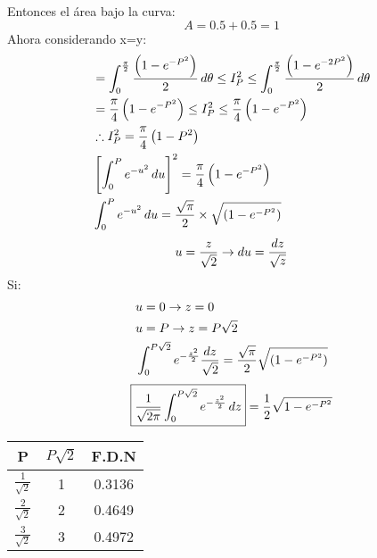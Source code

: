 \documentclass[
	12pt, %
	fleqn, %
	a4paper, %
]{LegrandOrangeBook}
\begin{document}
\begin{theorem}[Demostrar $\int_0^{\infty}e^{-u^2}\diff u=\frac{\sqrt{\pi}}{2}$]
Entonces el área bajo la curva:
\begin{displaymath}
A=0.5+0.5=1
\end{displaymath}
Ahora considerando x=y:
\begin{align*}
&=\int_0^{\frac{\pi}{2}}\frac{\left(1-e^{-P^2}\right)}{2}\mathop{}\!d\theta\leq I_P^2\leq \int_0^{\frac{\pi}{2}}\frac{\left(1-e^{-2P^2}\right)}{2}\mathop{}\!d\theta\\
&=\frac{\pi}{4}\left(1-e^{-P^2}\right)\leq I_P^2\leq\frac{\pi}{4}\left(1-e^{-P^2}\right)\\
&\therefore I_P^2=\frac{\pi}{4}\left(1-P^2\right)\\
&\left[\int_0^Pe^{-u^2}\mathop{}\!d u\right]^2=\frac{\pi}{4}\left(1-e^{-P^2}\right)\\
&\int_0^Pe^{-u^2}\mathop{}\!d u=\frac{\sqrt{\pi}}{2}\times\sqrt{(1-e^{-P^2})}
\end{align*}
\begin{displaymath}
u=\frac{z}{\sqrt{2}}\rightarrow\mathop{}\!d u=\frac{dz}{\sqrt{z}}
\end{displaymath}
Si:
\begin{align*}
&u=0\rightarrow z=0\\
&u=P\rightarrow z=P\sqrt{2}\\
&\int_0^{P\sqrt{2}}e^{-\frac{z^2}{2}}\frac{\mathop{}\!d z}{\sqrt{2}}=\frac{\sqrt{\pi}}{2}\sqrt{(1-e^{-P^2})}
\end{align*}
\begin{equation*}
\boxed{\frac{1}{\sqrt{2\pi}}\int_0^{P\sqrt{2}}e^{-\frac{z^2}{2}}\mathop{}\!d z}=\frac{1}{2}\sqrt{1-e^{-P^2}}
\end{equation*}
\begin{center}
\begin{tabular}{|c|c|c|}
\hline
P                    & $P\sqrt{2}$ & F.D.N  \\ \hline
$\frac{1}{\sqrt{2}}$ & 1           & 0.3136 \\ \hline
$\frac{2}{\sqrt{2}}$ & 2           & 0.4649 \\ \hline
$\frac{3}{\sqrt{2}}$ & 3           & 0.4972 \\ \hline
\end{tabular}
\end{center}
\end{theorem}
\newpage
\end{document}
